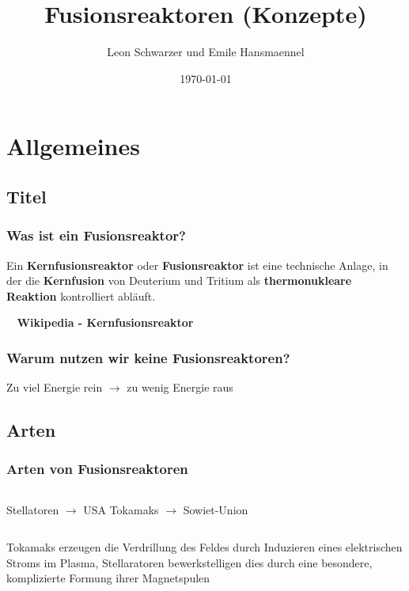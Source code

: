 \documentclass[aspectratio=169]{beamer}
\title{Fusionsreaktoren (Konzepte)}
\subtitle{}
\author{Leon Schwarzer und Emile Hansmaennel}
\institute{Theodor-Fliedner-Gymnasium}
\date{\today}
\begin{document}
  \begin{frame}
    \titlepage
  \end{frame}

  \section{Allgemeines}
    \subsection{Titel}

      \begin{frame}
        \frametitle{Was ist ein Fusionsreaktor?}
        Ein \textbf{Kernfusionsreaktor} oder \textbf{Fusionsreaktor} ist eine
        technische Anlage, in der die \textbf{Kernfusion} von Deuterium und Tritium als
        \textbf{thermonukleare Reaktion} kontrolliert abläuft.
        \par
        \raggedleft
        \textbf{~ Wikipedia - Kernfusionsreaktor}
      \end{frame}

      \begin{frame}
        \frametitle{Warum nutzen wir keine Fusionsreaktoren?}
        \center
        Zu viel Energie rein \( \rightarrow \) zu wenig Energie raus
      \end{frame}

    \subsection{Arten}

      \begin{frame}
        \frametitle{Arten von Fusionsreaktoren}
        \begin{columns}
          \center
          Stellatoren \( \rightarrow \) USA
          \bigskip
          \center
          Tokamaks \( \rightarrow \) Sowiet-Union
        \end{columns}

        \bigskip
        \bigskip
        \bigskip

        Tokamaks erzeugen die Verdrillung des Feldes durch Induzieren eines
        elektrischen Stroms im Plasma, Stellaratoren bewerkstelligen dies durch
        eine besondere, komplizierte Formung ihrer Magnetspulen

      \end{frame}
\end{document}

